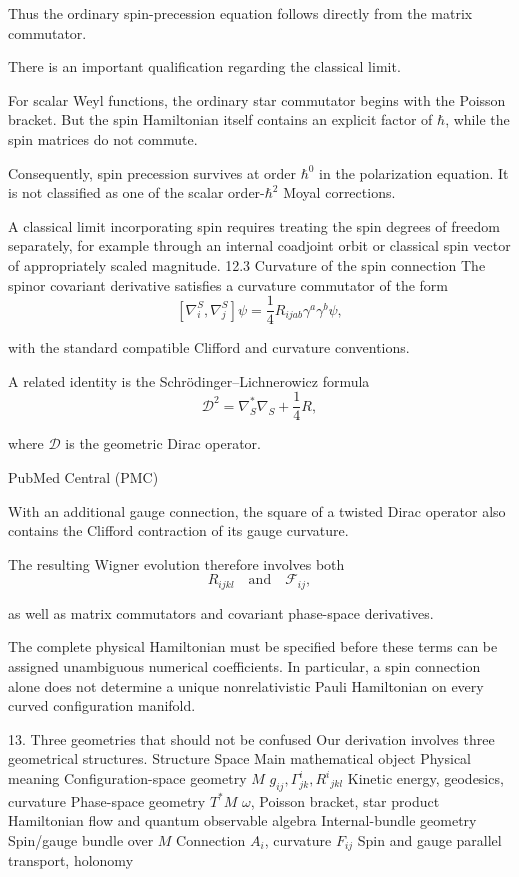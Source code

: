 Thus the ordinary spin-precession equation follows directly from the matrix commutator.

There is an important qualification regarding the classical limit.

For scalar Weyl functions, the ordinary star commutator begins with the Poisson bracket. But the spin Hamiltonian itself contains an explicit factor of \(\hbar\), while the spin matrices do not commute.

Consequently, spin precession survives at order \(\hbar^0\) in the polarization equation. It is not classified as one of the scalar order-\(\hbar^2\) Moyal corrections.

A classical limit incorporating spin requires treating the spin degrees of freedom separately, for example through an internal coadjoint orbit or classical spin vector of appropriately scaled magnitude.
12.3 Curvature of the spin connection
The spinor covariant derivative satisfies a curvature commutator of the form
\[
[\nabla_i^S,\nabla_j^S]\psi
=
\frac14R_{ijab}\gamma^a\gamma^b\psi,
\tag{95}
\]

with the standard compatible Clifford and curvature conventions.

A related identity is the Schrödinger–Lichnerowicz formula
\[
\boxed{
\mathcal D^2=
\nabla_S^*\nabla_S+\frac14R,
}
\tag{96}
\]

where \(\mathcal D\) is the geometric Dirac operator. 

PubMed Central (PMC)




With an additional gauge connection, the square of a twisted Dirac operator also contains the Clifford contraction of its gauge curvature.

The resulting Wigner evolution therefore involves both
\[
R_{ijkl}
\quad\text{and}\quad
\mathcal F_{ij},
\]

as well as matrix commutators and covariant phase-space derivatives.

The complete physical Hamiltonian must be specified before these terms can be assigned unambiguous numerical coefficients. In particular, a spin connection alone does not determine a unique nonrelativistic Pauli Hamiltonian on every curved configuration manifold.

13. Three geometries that should not be confused
Our derivation involves three geometrical structures.
Structure	Space	Main mathematical object	Physical meaning
Configuration-space geometry	\(M\)	\(g_{ij},\Gamma^i_{jk},R^i{}_{jkl}\)	Kinetic energy, geodesics, curvature
Phase-space geometry	\(T^*M\)	\(\omega\), Poisson bracket, star product	Hamiltonian flow and quantum observable algebra
Internal-bundle geometry	Spin/gauge bundle over \(M\)	Connection \(A_i\), curvature \(F_{ij}\)	Spin and gauge parallel transport, holonomy

